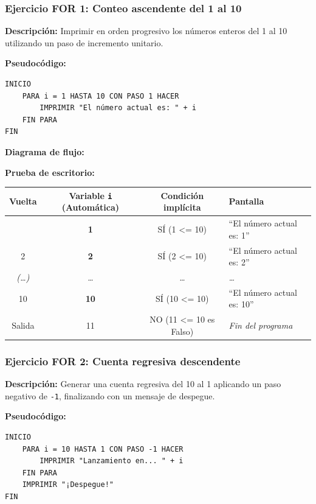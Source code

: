 \subsubsection{Ejercicio FOR 1: Conteo ascendente del 1 al
10}\label{ejercicio-for-1-conteo-ascendente-del-1-al-10}

\textbf{Descripción:} Imprimir en orden progresivo los números enteros
del 1 al 10 utilizando un paso de incremento unitario.

\textbf{Pseudocódigo:}

\begin{verbatim}
INICIO
    PARA i = 1 HASTA 10 CON PASO 1 HACER
        IMPRIMIR "El número actual es: " + i
    FIN PARA
FIN
\end{verbatim}

\textbf{Diagrama de flujo:}



\textbf{Prueba de escritorio:}

{\def\LTcaptype{none} %
\begin{longtable}[]{@{}cccl@{}}
\toprule\noalign{}
Vuelta & Variable \texttt{i} (Automática) & Condición implícita &
Pantalla \\
\midrule\noalign{}
\endhead
\bottomrule\noalign{}
\endlastfoot
1 & \textbf{1} & SÍ (1 \textless= 10) & ``El número actual es: 1'' \\
2 & \textbf{2} & SÍ (2 \textless= 10) & ``El número actual es: 2'' \\
\emph{(\ldots)} & \emph{\ldots{}} & \emph{\ldots{}} & \emph{\ldots{}} \\
10 & \textbf{10} & SÍ (10 \textless= 10) & ``El número actual es:
10'' \\
Salida & 11 & NO (11 \textless= 10 es Falso) & \emph{Fin del
programa} \\
\end{longtable}
}

\subsubsection{Ejercicio FOR 2: Cuenta regresiva
descendente}\label{ejercicio-for-2-cuenta-regresiva-descendente}

\textbf{Descripción:} Generar una cuenta regresiva del 10 al 1 aplicando
un paso negativo de \texttt{-1}, finalizando con un mensaje de despegue.

\textbf{Pseudocódigo:}

\begin{verbatim}
INICIO
    PARA i = 10 HASTA 1 CON PASO -1 HACER
        IMPRIMIR "Lanzamiento en... " + i
    FIN PARA
    IMPRIMIR "¡Despegue!"
FIN
\end{verbatim}


